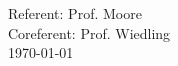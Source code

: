 
\maketitle		

\thispagestyle{empty}

\begin{center}
	
	Referent: Prof. Moore \\[0.5cm]
	Coreferent: Prof. Wiedling \\[2cm]
	\today
\end{center}


\vspace{1.4cm}


\linespread {1.25}\selectfont %



	

\newpage		
